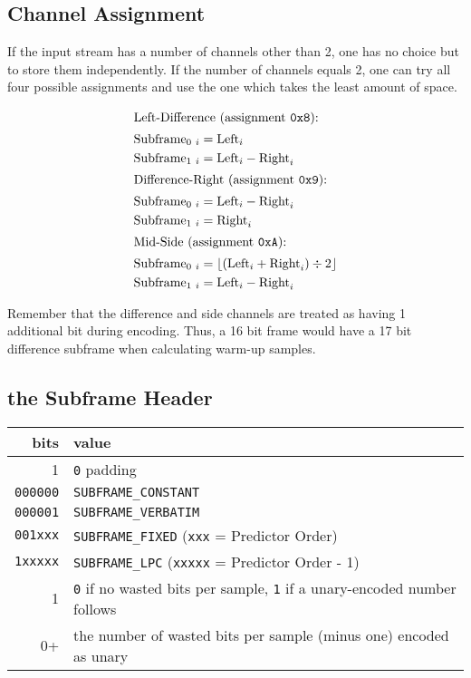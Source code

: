 \clearpage

\subsection{Channel Assignment}

If the input stream has a number of channels other than 2,
one has no choice but to store them independently.
If the number of channels equals 2, one can try all four possible
assignments and use the one which takes the least amount of space.

\begin{align*}
\intertext{Left-Difference (assignment \texttt{0x8}):}
\text{Subframe}_{0~i} &= \text{Left}_i \\
\text{Subframe}_{1~i} &= \text{Left}_i - \text{Right}_i \\
\intertext{Difference-Right (assignment \texttt{0x9}):}
\text{Subframe}_{0~i} &= \text{Left}_i - \text{Right}_i \\
\text{Subframe}_{1~i} &= \text{Right}_i \\
\intertext{Mid-Side (assignment \texttt{0xA}):}
\text{Subframe}_{0~i} &= \lfloor (\text{Left}_i + \text{Right}_i) \div 2 \rfloor \\
\text{Subframe}_{1~i} &= \text{Left}_i - \text{Right}_i \\
\end{align*}
\par
\noindent
Remember that the difference and side channels are treated as having
1 additional bit during encoding.
Thus, a 16 bit frame would have a 17 bit difference subframe
when calculating warm-up samples.

\subsection{the Subframe Header}
\begin{tabular}{|r|l|}
\hline
bits & value \\
\hline
1 & \texttt{0} padding \\
\texttt{000000} & \texttt{SUBFRAME\_CONSTANT} \\
\texttt{000001} & \texttt{SUBFRAME\_VERBATIM} \\
\texttt{001xxx} & \texttt{SUBFRAME\_FIXED} (\texttt{xxx} = Predictor Order) \\
\texttt{1xxxxx} & \texttt{SUBFRAME\_LPC} (\texttt{xxxxx} = Predictor Order - 1) \\
1 & \texttt{0} if no wasted bits per sample, \texttt{1} if a unary-encoded number follows \\
0+ & the number of wasted bits per sample (minus one) encoded as unary \\
\hline
\end{tabular}

